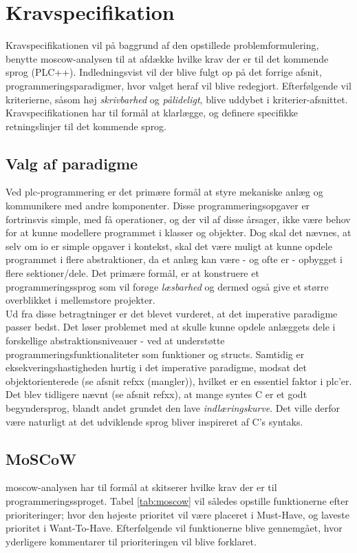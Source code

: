 \section{Kravspecifikation}
Kravspecifikationen vil på baggrund af den opstillede problemformulering, benytte \gls{moscow}-analysen til at afdække hvilke krav der er til det kommende sprog (PLC++). Indledningsvist vil der blive fulgt op på det forrige afsnit, programmeringsparadigmer, hvor valget heraf vil blive redegjort. Efterfølgende vil kriterierne, såsom høj \textit{skrivbarhed} og \textit{pålideligt}, blive uddybet i kriterier-afsnittet. Kravspecifikationen har til formål at klarlægge, og definere specifikke retningslinjer til det kommende sprog.

\subsection{Valg af paradigme}\label{ssec:paradigmevalg}
Ved \gls{plc}-programmering er det primære formål at styre mekaniske anlæg og kommunikere med andre komponenter. Disse programmeringsopgaver er fortrinsvis simple, med få operationer, og der vil af disse årsager, ikke være behov for at kunne modellere programmet i klasser og objekter. Dog skal det nævnes, at selv om \gls{io} er simple opgaver i kontekst, skal det være muligt at kunne opdele programmet i flere abstraktioner, da et anlæg kan være - og ofte er - opbygget i flere sektioner/dele. Det primære formål, er at konstruere et programmeringssprog som vil forøge \textit{læsbarhed} og dermed også give et større overblikket i mellemstore projekter. \\

\noindent Ud fra disse betragtninger er det blevet vurderet, at det imperative paradigme passer bedst. Det løser problemet med at skulle kunne opdele anlæggets dele i forskellige abstraktionsniveauer - ved at understøtte programmeringsfunktionaliteter som funktioner og structs. Samtidig er eksekveringshastigheden hurtig i det imperative paradigme, modsat det objektorienterede (se afsnit refxx (mangler)), hvilket er en essentiel faktor i \gls{plc}'er. \\

\noindent Det blev tidligere nævnt (se afsnit refxx), at mange syntes C er et godt begyndersprog, blandt andet grundet den lave \textit{indlæringskurve}. Det ville derfor være naturligt at det udviklende sprog bliver inspireret af C’s syntaks. 

\subsection{MoSCoW}
\gls{moscow}-analysen har til formål at skitserer hvilke krav der er til programmeringssproget. Tabel \ref{tab:moscow} vil således opstille funktionerne efter prioriteringer; hvor den højeste prioritet vil være placeret i Must-Have, og laveste prioritet i Want-To-Have. Efterfølgende vil funktionerne blive gennemgået, hvor yderligere kommentarer til prioriteringen vil blive forklaret.

